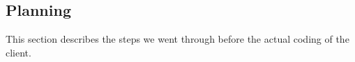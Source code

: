 \subsection{Planning}
This section describes the steps we went through before the actual coding of the client.



\newpage
